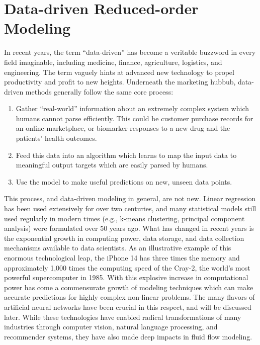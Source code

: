 \section{Data-driven Reduced-order Modeling}

In recent years, the term ``data-driven'' has become a veritable buzzword in every field imaginable, including medicine, finance, agriculture, logistics, and engineering. The term vaguely hints at advanced new technology to propel productivity and profit to new heights. Underneath the marketing hubbub, data-driven methods generally follow the same core process:

\begin{enumerate}
    \item Gather ``real-world'' information about an extremely complex system which humans cannot parse efficiently. This could be customer purchase records for an online marketplace, or biomarker responses to a new drug and the patients' health outcomes.
    \item Feed this data into an algorithm which learns to map the input data to meaningful output targets which are easily parsed by humans.
    \item Use the model to make useful predictions on new, unseen data points.
\end{enumerate}

This process, and data-driven modeling in general, are not new. Linear regression has been used extensively for over two centuries, and many statistical models still used regularly in modern times (e.g., k-means clustering, principal component analysis) were formulated over 50 years ago. What has changed in recent years is the exponential growth in computing power, data storage, and data collection mechanisms available to data scientists. As an illustrative example of this enormous technological leap, the iPhone 14 has three times the memory and approximately 1,000 times the computing speed of the Cray-2, the world's most powerful supercomputer in 1985. With this explosive increase in computational power has come a commensurate growth of modeling techniques which can make accurate predictions for highly complex non-linear problems. The many flavors of artificial neural networks have been crucial in this respect, and will be discussed later. While these technologies have enabled radical transformations of many industries through computer vision, natural language processing, and recommender systems, they have also made deep impacts in fluid flow modeling.

